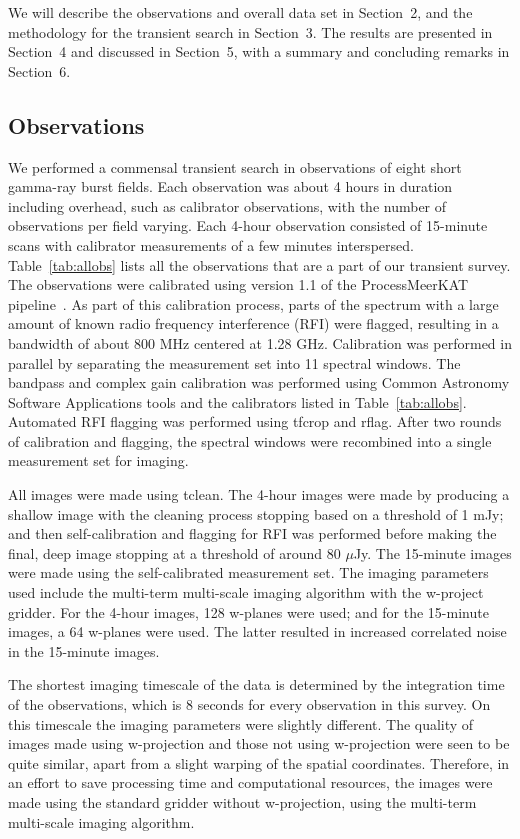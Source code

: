 \documentclass[12pt]{article}
\begin{document}
We will describe the observations and overall data set in Section~2, and the methodology for the transient search in Section~3. The results are presented in Section~4 and discussed in Section~5, with a summary and concluding remarks in Section~6.

\subsection{Observations}

We performed a commensal transient search in observations of eight short gamma-ray burst fields. Each observation was about 4 hours in duration including overhead, such as calibrator observations, with the number of observations per field varying. Each 4-hour observation consisted of 15-minute scans with calibrator measurements of a few minutes interspersed. Table~\ref{tab:allobs} lists all the observations that are a part of our transient survey. The observations were calibrated using version 1.1 of the ProcessMeerKAT pipeline~\citep[{\sc ProcessMeerKAT};][]{pminprep}. As part of this calibration process, parts of the spectrum with a large amount of known radio frequency interference (RFI) were flagged, resulting in a bandwidth of about 800 MHz centered at 1.28 GHz. Calibration was performed in parallel by separating the measurement set into 11 spectral windows. The bandpass and complex gain calibration was performed using Common Astronomy Software Applications \citep[{\sc CASA;}][]{2022arXiv221002276T} tools and the calibrators listed in Table~\ref{tab:allobs}. Automated RFI flagging was performed using tfcrop and rflag. After two rounds of calibration and flagging, the spectral windows were recombined into a single measurement set for imaging. 

All images were made using tclean. The 4-hour images were made by producing a shallow image with the cleaning process stopping based on a threshold of 1 mJy; and then self-calibration and flagging for RFI was performed before making the final, deep image stopping at a threshold of around 80 $\mu$Jy. The 15-minute images were made using the self-calibrated measurement set. The imaging parameters used include the multi-term multi-scale imaging algorithm with the w-project gridder. For the 4-hour images, 128 w-planes were used; and for the 15-minute images, a 64 w-planes were used. The latter resulted in increased correlated noise in the 15-minute images. 

The shortest imaging timescale of the data is determined by the integration time of the observations, which is 8 seconds for every observation in this survey. On this timescale the imaging parameters were slightly different. The quality of images made using w-projection and those not using w-projection were seen to be quite similar, apart from a slight warping of the spatial coordinates. Therefore, in an effort to save processing time and computational resources, the images were made using the standard gridder without w-projection, using the multi-term multi-scale imaging algorithm.
\end{document}
